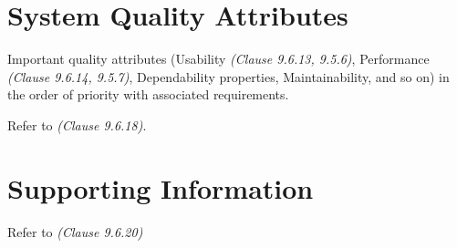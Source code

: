\section{System Quality Attributes}
Important quality attributes (Usability \textit{(Clause 9.6.13, 9.5.6)}, Performance \textit{(Clause 9.6.14, 9.5.7)}, Dependability properties, Maintainability, and so on) in the order of priority with associated requirements.

Refer to \textit{(Clause 9.6.18)}.


\section{Supporting Information}

Refer to \textit{(Clause 9.6.20)}


